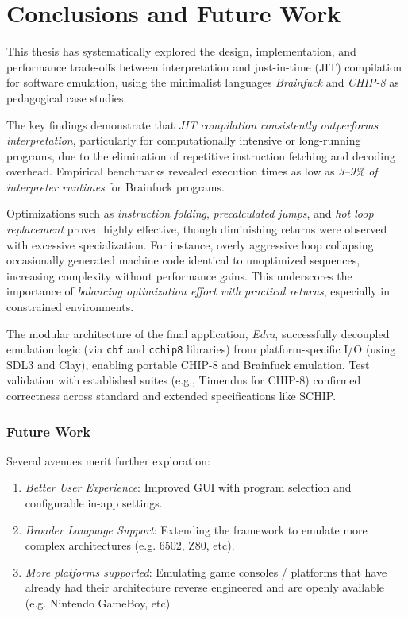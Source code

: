 \clearpage

\chapter{Conclusions and Future Work}
\label{conclusions}

\par This thesis has systematically explored the design, implementation, and performance trade-offs between interpretation and just-in-time (JIT) compilation for software emulation, using the minimalist languages \textit{Brainfuck} and \textit{CHIP-8} as pedagogical case studies.

\par The key findings demonstrate that \textit{JIT compilation consistently outperforms interpretation}, particularly for computationally intensive or long-running programs, due to the elimination of repetitive instruction fetching and decoding overhead. Empirical benchmarks revealed execution times as low as \textit{3--9\% of interpreter runtimes} for Brainfuck programs.

\par Optimizations such as \textit{instruction folding}, \textit{precalculated jumps}, and \textit{hot loop replacement} proved highly effective, though diminishing returns were observed with excessive specialization. For instance, overly aggressive loop collapsing occasionally generated machine code identical to unoptimized sequences, increasing complexity without performance gains. This underscores the importance of \textit{balancing optimization effort with practical returns}, especially in constrained environments.

\par The modular architecture of the final application, \textit{Edra}, successfully decoupled emulation logic (via \texttt{cbf} and \texttt{cchip8} libraries) from platform-specific I/O (using SDL3 and Clay), enabling portable CHIP-8 and Brainfuck emulation. Test validation with established suites (e.g., Timendus for CHIP-8) confirmed correctness across standard and extended specifications like SCHIP.

\subsection*{Future Work}

\par Several avenues merit further exploration:

\begin{enumerate}
    \item \textit{Better User Experience}: Improved GUI with program selection and configurable in-app settings.
    \item \textit{Broader Language Support}: Extending the framework to emulate more complex architectures (e.g. 6502, Z80, etc).
    \item \textit{More platforms supported}: Emulating game consoles / platforms that have already had their architecture reverse engineered and are openly available (e.g. Nintendo GameBoy, etc)
\end{enumerate}